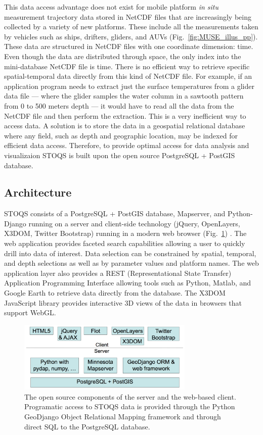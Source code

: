 \documentclass[conference]{IEEEtran}
\begin{document}
This data access advantage does not exist for mobile platform \textit{in situ} measurement trajectory data stored in NetCDF files that are increasingly being collected by a variety of new platforms. These include all the measurements taken by vehicles such as ships, drifters, gliders, and AUVs (Fig.~\ref{fig:MUSE_illus_pp}). These data are structured in NetCDF files with one coordinate dimension: time. Even though the data are distributed through space, the only index into the mini-database NetCDF file is time. There is no efficient way to retrieve specific spatial-temporal data directly from this kind of NetCDF file. For example, if an application program needs to extract just the surface temperatures from a glider data file --- where the glider samples the water column in a sawtooth pattern from 0 to 500 meters depth --- it would have to read all the data from the NetCDF file and then perform the extraction. This is a very inefficient way to access data. A solution is to store the data in a geospatial relational database where any field, such as depth and geographic location,  may be indexed for efficient data access. Therefore, to provide optimal access for data analysis and visualizaion STOQS is built upon the open source PostgreSQL + PostGIS database.



\subsection{Architecture}

STOQS consists of a PostgreSQL + PostGIS database, Mapserver, and Python-Django running on a server and client-side technology (jQuery, OpenLayers, X3DOM, Twitter Bootstrap) running in a modern web browser (Fig.~\ref{fig:STOQSArch}) . The web application provides faceted search capabilities allowing a user to quickly drill into data of interest. Data selection can be constrained by spatial, temporal, and depth selections as well as by parameter values and platform names. The web application layer also provides a REST (Representational State Transfer) Application Programming Interface allowing tools such as Python, Matlab, and Google Earth to retrieve data directly from the database. The X3DOM JavaScript library provides interactive 3D views of the data in browsers that support WebGL.

\begin{figure}[htbp]
\centering
\includegraphics[width=3.3in]{stoqs_arch_simple.png}
\caption{The open source components of the server and the web-based client. Programatic access to STOQS data is provided through the Python GeoDjango Object Relational Mapping framework and through direct SQL to the PostgreSQL database.}
\label{fig:STOQSArch}
\end{figure}
\end{document}

